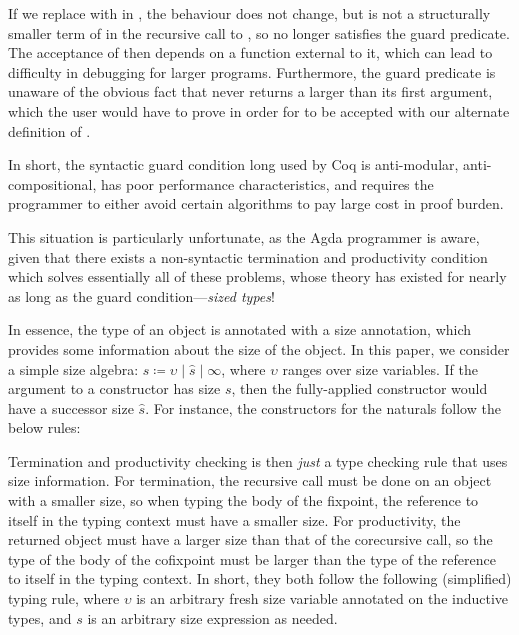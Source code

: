 If we replace  with  in , the behaviour does not change, but  is not a structurally smaller term of  in the recursive call to , so  no longer satisfies the guard predicate.
The acceptance of  then depends on a function external to it, which can lead to difficulty in debugging for larger programs.
Furthermore, the guard predicate is unaware of the obvious fact that  never returns a  larger than its first argument, which the user would have to prove in order for  to be accepted with our alternate definition of .

In short, the syntactic guard condition long used by Coq is anti-modular, anti-compositional, has poor performance characteristics, and requires the programmer to either avoid certain algorithms to pay large cost in proof burden.

This situation is particularly unfortunate, as the Agda programmer is aware, given that there exists a non-syntactic termination and productivity condition which solves essentially all of these problems, whose theory has existed for nearly as long as the guard condition---\emph{sized types}!

In essence, the \coinductive type of an object is annotated with a size annotation, which provides some information about the size of the object.
In this paper, we consider a simple size algebra: \mbox{$s \coloneqq \upsilon \mid \hat{s} \mid \infty$}, where $\upsilon$ ranges over size variables.
If the argument to a constructor has size $s$, then the fully-applied constructor would have a successor size $\hat{s}$.
For instance, the constructors for the naturals follow the below rules:

\vspace{-2ex}

Termination and productivity checking is then \emph{just} a type checking rule that uses size information.
For termination, the recursive call must be done on an object with a smaller size, so when typing the body of the fixpoint, the reference to itself in the typing context must have a smaller size.
For productivity, the returned object must have a larger size than that of the corecursive call, so the type of the body of the cofixpoint must be larger than the type of the reference to itself in the typing context.
In short, they both follow the following (simplified) typing rule, where $\upsilon$ is an arbitrary fresh size variable annotated on the inductive types, and $s$ is an arbitrary size expression as needed.

